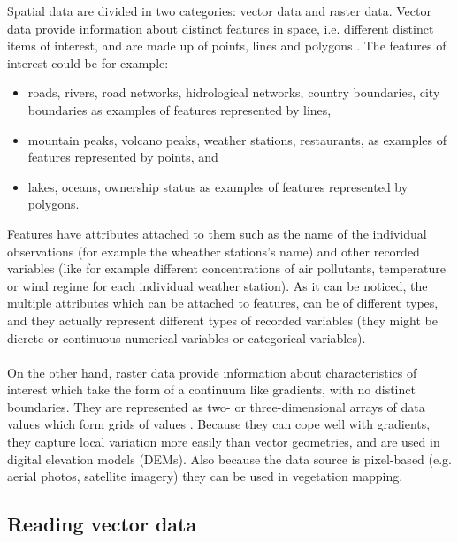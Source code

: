 \documentclass {article}
\begin{document}
Spatial data are divided in two categories: vector data and raster data. Vector data provide information about distinct features in space, i.e. different distinct items of interest, and are made up of points, lines and polygons \cite{garrard_geoprocessing_2016}. The features of interest could be for example:
\begin{itemize}
\item roads, rivers, road networks, hidrological networks, country boundaries, city boundaries as examples of features represented by lines,
\item  mountain peaks, volcano peaks, weather stations, restaurants, as examples of features represented by points, and 
\item lakes, oceans, ownership status as examples of features represented by polygons.     
\end{itemize}
Features have attributes attached to them such as the name of the individual observations (for example the wheather stations's name) and other recorded variables (like for example different concentrations of air pollutants, temperature or wind regime for each individual weather station). As it can be noticed, the multiple attributes which can be attached to features, can be of different types, and they actually represent different types of recorded variables (they might be dicrete or continuous numerical variables or categorical variables). \\ 
\\
On the other hand, raster data provide information about characteristics of interest which take the form of a continuum like gradients, with no distinct boundaries. They are represented as two- or three-dimensional arrays of data values which form grids of values \cite{garrard_geoprocessing_2016}.
Because they can cope well with gradients, they capture local variation more easily than vector geometries, and are used in digital elevation models (DEMs). Also because the data source is pixel-based (e.g. aerial photos, satellite imagery) they can be used in vegetation mapping.     

\subsection {Reading vector data}
\end{document}
